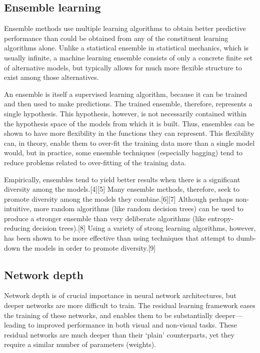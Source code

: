 \documentclass[12pt]{article}
\numberwithin{equation}{section}
\numberwithin{table}{section}
\numberwithin{figure}{section}
\begin{document}
\subsection{Ensemble learning}
Ensemble methods use multiple learning algorithms to obtain better predictive performance than could be obtained from any of the constituent learning algorithms alone. Unlike a statistical ensemble in statistical mechanics, which is usually infinite, a machine learning ensemble consists of only a concrete finite set of alternative models, but typically allows for much more flexible structure to exist among those alternatives.

An ensemble is itself a supervised learning algorithm, because it can be trained and then used to make predictions. The trained ensemble, therefore, represents a single hypothesis. This hypothesis, however, is not necessarily contained within the hypothesis space of the models from which it is built. Thus, ensembles can be shown to have more flexibility in the functions they can represent. This flexibility can, in theory, enable them to over-fit the training data more than a single model would, but in practice, some ensemble techniques (especially bagging) tend to reduce problems related to over-fitting of the training data.

Empirically, ensembles tend to yield better results when there is a significant diversity among the models.[4][5] Many ensemble methods, therefore, seek to promote diversity among the models they combine.[6][7] Although perhaps non-intuitive, more random algorithms (like random decision trees) can be used to produce a stronger ensemble than very deliberate algorithms (like entropy-reducing decision trees).[8] Using a variety of strong learning algorithms, however, has been shown to be more effective than using techniques that attempt to dumb-down the models in order to promote diversity.[9]

\subsection{Network depth}

Network depth is of crucial importance in neural network architectures, but deeper networks are more difficult to train. The residual learning framework eases the training of these networks, and enables them to be substantially deeper — leading to improved performance in both visual and non-visual tasks. These residual networks are much deeper than their ‘plain’ counterparts, yet they require a similar number of parameters (weights).
\end{document}
